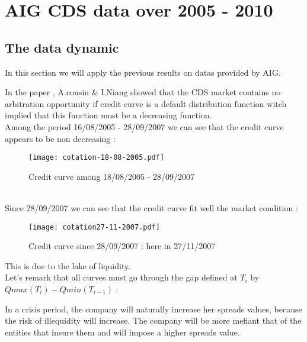 
\section{AIG CDS data over 2005 - 2010}
\label{sec:aig-cds-data}

\subsection{The data dynamic}
\label{sec:data-dynamic}



In this section we will apply the previous results on datas provided by AIG.

In the paper \cite{OTRATS}, A.cousin \& I.Niang showed that the CDS market contains
no  arbitration   opportunity  if   credit  curve   is  a   default  distribution
function witch implied that this function must be a decreasing function.\\
Among  the period  16/08/2005 -  28/09/2007  we can  see that  the credit  curve
appears to be non decreasing :

\begin{figure}[H]
  \centering
  \texttt{[image: cotation-18-08-2005.pdf]}
  \caption{Credit curve among 18/08/2005 -  28/09/2007}
\end{figure}
\\
Since 28/09/2007 we can see that the credit curve fit well the market condition
:


\begin{figure}[H]
  \centering
  \texttt{[image: cotation27-11-2007.pdf]}
  \caption{Credit curve since 28/09/2007 : here in 27/11/2007}
\end{figure}

This is due to the lake of liquidity.\\
Let's remark that all curves must go through the gap defined at $T_i$ by
 $Qmax(T_{i})-Qmin(T_{i-1})$ :
 \begin{center}

 \end{center}

In a  crisis period,  the company  will naturally  increase her  spreads values,
because the risk of illequidity will  increase. The company will be more mefiant
that of the entities that insure them and will impose a higher spreads value.

